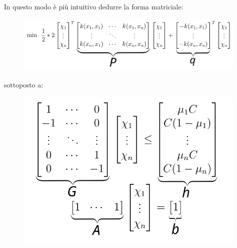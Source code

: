 \documentclass[a4paper,12pt]{report}
\begin{document}
\noindent In questo modo è più intuitivo dedurre la forma matriciale:
\begin{figure}[H]
    \includegraphics[width = 14cm]{images/Matrici_P_q.png}
    \centering
\end{figure}
\noindent sottoposto a:
\begin{figure}[H]
    \includegraphics[width = 9 cm, height = 7 cm ]{images/Matrici_G_h_A_b.png}
    \centering
\end{figure}
\end{document}
